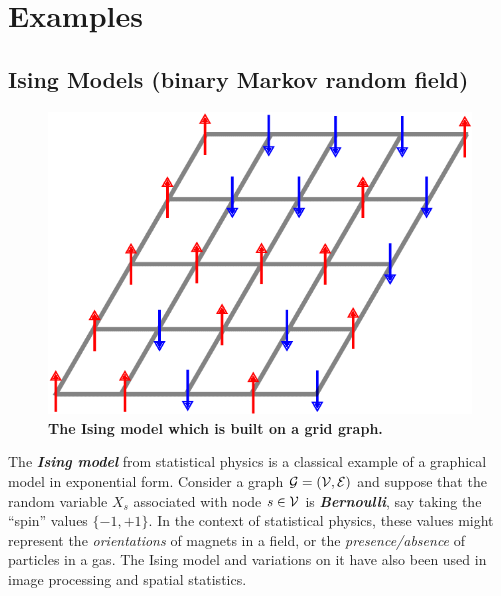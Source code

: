 \documentclass[11pt]{article}
\begin{document}
\section{Examples}
\subsection{Ising Models (binary Markov random field)}
\begin{figure}
\begin{minipage}[t]{1\linewidth}
  \centering
  \centerline{\includegraphics[scale = 0.3]{Ising_model.png}}
\end{minipage}
\caption{\footnotesize{\textbf{The Ising model which is built on a grid graph.}}}
\label{fig: Ising_model}
\end{figure}
The \textbf{\emph{Ising model}} from statistical physics is a classical example of a graphical model in exponential form. Consider a graph ${\mathcal G} = ({\mathcal V},{\mathcal E})$ and suppose that the random variable $X_s$ associated with node $s \in {\mathcal V}$ is \emph{\textbf{Bernoulli}}, say taking the “spin” values $\{-1,+1\}$.  In the context of statistical physics, these
values might represent the \emph{orientations} of magnets in a field, or the \emph{presence/absence} of particles in a gas. The Ising model and variations on it have also been used in image processing and spatial statistics.
\end{document}

